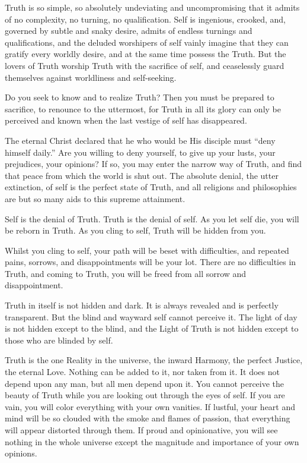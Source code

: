 \documentclass[12pt,oneside]{scrbook}
\begin{document}
  Truth is so simple, so absolutely undeviating and uncompromising that it
  admits of no complexity, no turning, no qualification. Self is
  ingenious, crooked, and, governed by subtle and snaky desire, admits of
  endless turnings and qualifications, and the deluded worshipers of self
  vainly imagine that they can gratify every worldly desire, and at the
  same time possess the Truth. But the lovers of Truth worship Truth with
  the sacrifice of self, and ceaselessly guard themselves against
  worldliness and self-seeking.
  
  Do you seek to know and to realize Truth? Then you must be prepared to
  sacrifice, to renounce to the uttermost, for Truth in all its glory can
  only be perceived and known when the last vestige of self has
  disappeared.
  
  The eternal Christ declared that he who would be His disciple must
  ``deny himself daily.'' Are you willing to deny yourself, to give up
  your lusts, your prejudices, your opinions? If so, you may enter the
  narrow way of Truth, and find that peace from which the world is shut
  out. The absolute denial, the utter extinction, of self is the perfect
  state of Truth, and all religions and philosophies are but so many aids
  to this supreme attainment.
  
  Self is the denial of Truth. Truth is the denial of self. As you let
  self die, you will be reborn in Truth. As you cling to self, Truth will
  be hidden from you.
  
  Whilst you cling to self, your path will be beset with difficulties, and
  repeated pains, sorrows, and disappointments will be your lot. There are
  no difficulties in Truth, and coming to Truth, you will be freed from
  all sorrow and disappointment.
  
  Truth in itself is not hidden and dark. It is always revealed and is
  perfectly transparent. But the blind and wayward self cannot perceive
  it. The light of day is not hidden except to the blind, and the Light of
  Truth is not hidden except to those who are blinded by self.
  
  Truth is the one Reality in the universe, the inward Harmony, the
  perfect Justice, the eternal Love. Nothing can be added to it, nor taken
  from it. It does not depend upon any man, but all men depend upon it.
  You cannot perceive the beauty of Truth while you are looking out
  through the eyes of self. If you are vain, you will color everything
  with your own vanities. If lustful, your heart and mind will be so
  clouded with the smoke and flames of passion, that everything will
  appear distorted through them. If proud and opinionative, you will see
  nothing in the whole universe except the magnitude and importance of
  your own opinions.
  
\end{document}
